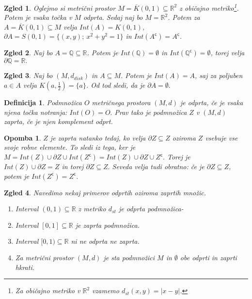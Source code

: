 \documentclass[10pt, a4paper]{article}
\newtheorem{defi}{Definicija}[section]
\newenvironment{noticeB}{%
  \tcolorbox[%
  notitle,
  empty,
  enhanced,  %
  breakable,
  coltext=black,
  colback=white, 
  fontupper=\rmfamily,
  parbox=false,
  noparskip,
  sharp corners,
  boxrule=-1pt,  %
  frame hidden,
  left=7pt,  %
  right=7pt,
  top=5pt,
  bottom=5pt,
  before skip=2.5ex plus 2pt,
  after skip=2.5ex plus 2pt,
  borderline west = {1.5pt}{-0.1pt}{blue!30!black}, %
  overlay unbroken and last={%
    \draw[color=black, line width=1.25pt]
    ($(frame.south west)+(1.pt, -0.1pt)$) -- ++(2em, 0);
  }
  ]}
{\endtcolorbox}
\newenvironment{definicija}{\begin{defi}\begin{noticeB}}{%
    \end{noticeB}\end{defi}}
\newtheorem*{opomba}{Opomba}
\newtheorem{zgled}{Zgled}[section]
\newcommand{\stcomp}[1]{{#1}^{\mathsf{c}}}
\newcommand{\Q}{\mathbb {Q}}
\newcommand{\R}{\mathbb {R}}
\begin{document}
\begin{zgled}
    Oglejmo si metrični prostor $M = \overline{K}(0,1) \subseteq \R^2$ z običajno metriko\footnote{Za običajno metriko v $\R^2$ vzamemo $d_{st} (x,y) = |x - y|$.}.
    Potem je vsaka točka v $M$ odprta. Sedaj naj bo $M = \R^2$.
    Potem za $A = \overline{K}(0,1) \subseteq M$ velja $Int(A) = K(0,1)$, $\partial A = S(0,1) = \{(x,y);\ x^2 + y^2 = 1\}$ in $Int(\stcomp{A}) = \stcomp{A}$.
\end{zgled}

\begin{zgled}
    Naj bo $A = \Q \subseteq \R$. Potem je $Int(\Q) = \emptyset$ in $Int(\stcomp{\Q}) = \emptyset$, torej velja $\partial \Q = \R.$
\end{zgled}

\begin{zgled}
    Naj bo $(M, d_{disk})$ in $A \subseteq M$. Potem je $Int(A) = A$, saj za poljuben $a \in A$ velja $K(a, \frac{1}{2}) = \{a\}$.
    Od tod sledi, da je $\partial A = \emptyset.$
\end{zgled}

\begin{definicija}
    Podmnožica $O$ metričnega prostora $(M, d)$ je odprta, če je vsaka njena točka notranja: $Int(O) = O.$
    Prav tako je podmnožica $Z$ v $(M, d)$ zaprta, če je njen komplement odprt.
\end{definicija}

\begin{opomba}
    $Z$ je zaprta natanko tedaj, ko velja $\partial Z \subseteq Z$ oziroma $Z$ vsebuje vse svoje robne elemente.
    To sledi iz tega, ker je $M = Int(Z) \cup \partial Z \cup Int(\stcomp{Z}) = Int(Z) \cup \partial Z \cup \stcomp{Z}.$
    Torej je $Int(Z) \cup \partial Z = Z$ in torej $\partial Z \subseteq Z.$
    Seveda velja tudi obratno: če je $\partial Z \subseteq Z$, potem je $Int(\stcomp{Z}) = \stcomp{Z}$.
\end{opomba}

\begin{zgled}
    Navedimo nekaj primerov odprtih oziroma zaprtih množic.
    \begin{enumerate}
        \item Interval $(0,1) \subseteq \R$ z metriko $d_{st}$ je odprta podmnožica-
        \item Interval $[0,1] \subseteq \R$ je zaprta podmnožica.
        \item Interval $[0, 1) \subseteq \R$ ni ne odprta ne zaprta.
        \item Za metrični prostor $(M, d)$ je sta podmnožici $M$ in $\emptyset$ obe odprti in zaprti hkrati. 
    \end{enumerate}
\end{zgled}
\end{document}
